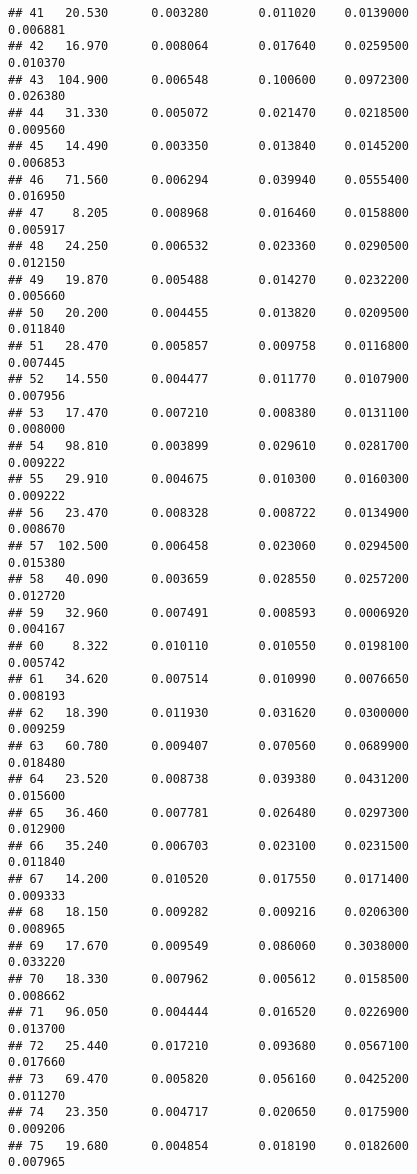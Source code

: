 \documentclass[
]{article}
\begin{document}
\begin{verbatim}
## 41   20.530      0.003280       0.011020    0.0139000          0.006881
## 42   16.970      0.008064       0.017640    0.0259500          0.010370
## 43  104.900      0.006548       0.100600    0.0972300          0.026380
## 44   31.330      0.005072       0.021470    0.0218500          0.009560
## 45   14.490      0.003350       0.013840    0.0145200          0.006853
## 46   71.560      0.006294       0.039940    0.0555400          0.016950
## 47    8.205      0.008968       0.016460    0.0158800          0.005917
## 48   24.250      0.006532       0.023360    0.0290500          0.012150
## 49   19.870      0.005488       0.014270    0.0232200          0.005660
## 50   20.200      0.004455       0.013820    0.0209500          0.011840
## 51   28.470      0.005857       0.009758    0.0116800          0.007445
## 52   14.550      0.004477       0.011770    0.0107900          0.007956
## 53   17.470      0.007210       0.008380    0.0131100          0.008000
## 54   98.810      0.003899       0.029610    0.0281700          0.009222
## 55   29.910      0.004675       0.010300    0.0160300          0.009222
## 56   23.470      0.008328       0.008722    0.0134900          0.008670
## 57  102.500      0.006458       0.023060    0.0294500          0.015380
## 58   40.090      0.003659       0.028550    0.0257200          0.012720
## 59   32.960      0.007491       0.008593    0.0006920          0.004167
## 60    8.322      0.010110       0.010550    0.0198100          0.005742
## 61   34.620      0.007514       0.010990    0.0076650          0.008193
## 62   18.390      0.011930       0.031620    0.0300000          0.009259
## 63   60.780      0.009407       0.070560    0.0689900          0.018480
## 64   23.520      0.008738       0.039380    0.0431200          0.015600
## 65   36.460      0.007781       0.026480    0.0297300          0.012900
## 66   35.240      0.006703       0.023100    0.0231500          0.011840
## 67   14.200      0.010520       0.017550    0.0171400          0.009333
## 68   18.150      0.009282       0.009216    0.0206300          0.008965
## 69   17.670      0.009549       0.086060    0.3038000          0.033220
## 70   18.330      0.007962       0.005612    0.0158500          0.008662
## 71   96.050      0.004444       0.016520    0.0226900          0.013700
## 72   25.440      0.017210       0.093680    0.0567100          0.017660
## 73   69.470      0.005820       0.056160    0.0425200          0.011270
## 74   23.350      0.004717       0.020650    0.0175900          0.009206
## 75   19.680      0.004854       0.018190    0.0182600          0.007965

\end{verbatim}
\end{document}
